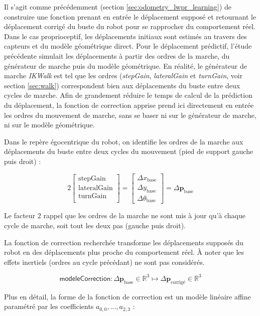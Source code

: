 Il s'agit comme précédemment (section \ref{sec:odometry_lwpr_learning}) de construire 
une fonction prenant en entrée le déplacement supposé et retournant
le déplacement corrigé du buste du robot pour se rapprocher du comportement réel.
Dans le cas proprioceptif, les déplacements initiaux sont estimés au travers 
des capteurs et du modèle géométrique direct.
Pour le déplacement prédictif, l'étude précédente simulait les déplacements à partir 
des ordres de la marche, du générateur de marche puis du modèle géométrique.
En réalité, le générateur de marche \textit{IKWalk} est tel que les ordres 
(\textit{stepGain}, \textit{lateralGain} et \textit{turnGain}, voir section \ref{sec:walk}) 
correspondent bien aux déplacements du buste entre deux cycles de marche.
Afin de grandement réduire le temps de calcul de la prédiction du déplacement, 
la fonction de correction apprise prend ici directement en entrée les ordres
du mouvement de marche, sans se baser ni sur le générateur de marche, ni sur le modèle géométrique.

Dans le repère égocentrique du robot, on identifie les ordres de la marche 
aux déplacements du buste entre deux cycles du mouvement (pied de support gauche puis droit) :

$$
2
\begin{bmatrix}
    \text{stepGain} \\
    \text{lateralGain} \\
    \text{turnGain} \\
\end{bmatrix}
=
\begin{bmatrix}
    \Delta x_{\text{base}} \\   
    \Delta y_{\text{base}} \\   
    \Delta \theta_{\text{base}}
\end{bmatrix}
=
\Delta \bm{p}_{\text{base}}
$$

Le facteur $2$ rappel que les ordres de la marche ne sont mis à jour 
qu'à chaque cycle de marche, soit tout les deux pas (gauche puis droit).

La fonction de correction recherchée transforme les déplacements supposés 
du robot en des déplacements plus proche du comportement réel.
À noter que les effets inertiels (ordres au cycle précédant) ne sont pas considérés.

$$
\mathsf{modeleCorrection} : \Delta \bm{p}_{\text{base}} \in \mathbb{R}^{3} 
\longmapsto 
\Delta \bm{p}_{\text{corrigé}} \in \mathbb{R}^{3}
$$

Plus en détail, la forme de la fonction de correction est un modèle linéaire affine
paramétré par les coefficients $a_{0,0},...,a_{2,3}$ :

